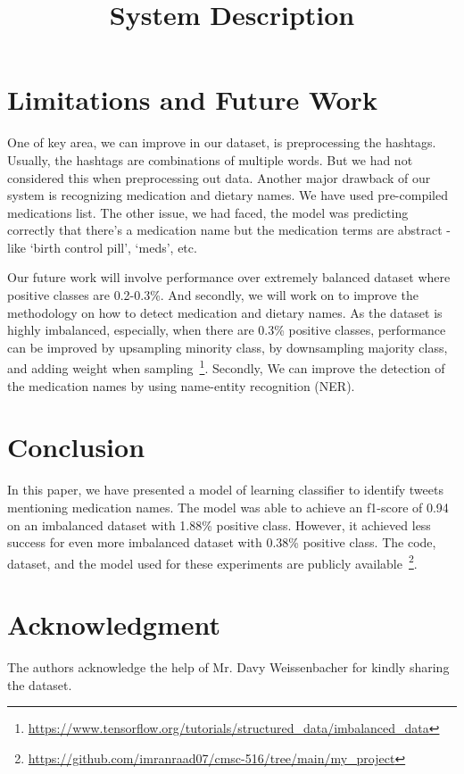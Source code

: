 \documentclass[12pt, onecolumn, conference]{IEEEtran}
\begin{document}
	
	\title{System Description}
	
	\author{
	}
	
	\maketitle
	
	
	
	
	
	

	
		
	\section{Limitations and Future Work}
	One of key area, we can improve in our dataset, is preprocessing the hashtags. Usually, the hashtags are combinations of multiple words. But we had not considered this when preprocessing out data. Another major drawback of our system is recognizing medication and dietary names. We have used pre-compiled medications list. The other issue, we had faced, the model was predicting correctly that there's a medication name but the medication terms are abstract - like `birth control pill', `meds', etc. 
	
	Our future work will involve performance over extremely balanced dataset where positive classes are 0.2-0.3\%. And secondly, we will work on to improve the methodology on how to detect medication and dietary names. As the dataset is highly imbalanced, especially, when there are 0.3\% positive classes, performance can be improved by upsampling minority class, by downsampling majority class, and adding weight when sampling~\footnote{\url{https://www.tensorflow.org/tutorials/structured_data/imbalanced_data}}. Secondly,	We can improve the detection of the medication names by using name-entity recognition (NER).
	
	\section{Conclusion}
	In this paper, we have presented a model of learning classifier to identify tweets mentioning medication names. The model was able to achieve an f1-score of 0.94 on an imbalanced dataset with 1.88\% positive class. However, it achieved less success for even more imbalanced dataset with 0.38\% positive class. The code, dataset, and the model used for these experiments are publicly available~\footnote{\url{https://github.com/imranraad07/cmsc-516/tree/main/my_project}}.

	\section{Acknowledgment}
	The authors acknowledge the help of Mr. Davy Weissenbacher for kindly sharing the dataset.

	
	
	
\end{document}
